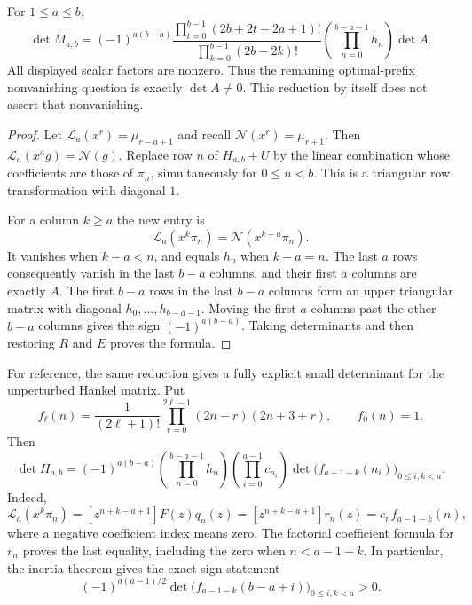 \begin{theorem}
\label{thm:general-small-determinant}
For $1\leq a\leq b$,
\begin{equation}\label{eq:general-small-det}
 \det M_{a,b}=
 (-1)^{a(b-a)}
 \frac{\prod_{t=0}^{b-1}(2b+2t-2a+1)!}
      {\prod_{k=0}^{b-1}(2b-2k)!}
 \left(\prod_{n=0}^{b-a-1}h_n\right)\det A.
\end{equation}
All displayed scalar factors are nonzero.  Thus the remaining
optimal-prefix nonvanishing question is exactly $\det A\ne0$.
This reduction by itself does not assert that nonvanishing.
\end{theorem}

\begin{proof}
Let $\mathcal L_a(x^r)=\mu_{r-a+1}$ and recall
$\mathcal N(x^r)=\mu_{r+1}$.  Then
$\mathcal L_a(x^ag)=\mathcal N(g)$.  Replace row $n$ of
$H_{a,b}+U$ by the linear combination whose coefficients are those
of $\pi_n$, simultaneously for $0\leq n<b$.  This is a triangular
row transformation with diagonal $1$.

For a column $k\geq a$ the new entry is
\[
 \mathcal L_a(x^k\pi_n)=\mathcal N(x^{k-a}\pi_n).
\]
It vanishes when $k-a<n$, and equals $h_n$ when $k-a=n$.
The last $a$ rows consequently vanish in the last $b-a$ columns,
and their first $a$ columns are exactly $A$.  The first $b-a$ rows
in the last $b-a$ columns form an upper triangular matrix with
diagonal $h_0,\ldots,h_{b-a-1}$.  Moving the first $a$ columns past
the other $b-a$ columns gives the sign $(-1)^{a(b-a)}$.
Taking determinants and then restoring $R$ and $E$ proves the formula.
\end{proof}

For reference, the same reduction gives a fully explicit
small determinant for the unperturbed Hankel matrix.  Put
\[
 f_\ell(n)=\frac1{(2\ell+1)!}
 \prod_{r=0}^{2\ell-1}(2n-r)(2n+3+r),\qquad f_0(n)=1.
\]
Then
\begin{equation}\label{eq:general-H-small-det}
 \det H_{a,b}=(-1)^{a(b-a)}
 \left(\prod_{n=0}^{b-a-1}h_n\right)
 \left(\prod_{i=0}^{a-1}c_{n_i}\right)
 \det\bigl(f_{a-1-k}(n_i)\bigr)_{0\leq i,k<a}.
\end{equation}
Indeed,
\[
 \mathcal L_a(x^k\pi_n)
 =[z^{n+k-a+1}]F(z)q_n(z)
 =[z^{n+k-a+1}]r_n(z)
 =c_n f_{a-1-k}(n),
\]
where a negative coefficient index means zero.  The factorial
coefficient formula for $r_n$ proves the last equality, including
the zero when $n<a-1-k$.  In particular, the inertia theorem gives
the exact sign statement
\[
 (-1)^{a(a-1)/2}
 \det\bigl(f_{a-1-k}(b-a+i)\bigr)_{0\leq i,k<a}>0.
\]

